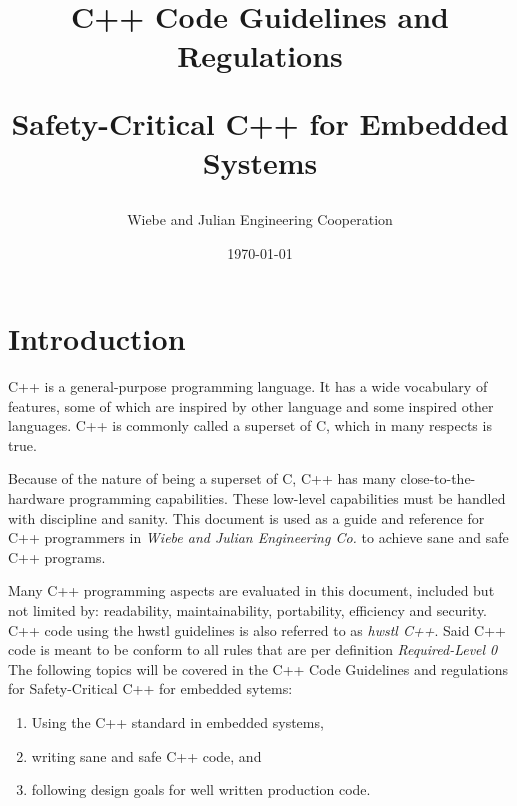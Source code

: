 \documentclass[12pt]{article}
\title{
      C++ Code Guidelines and Regulations \\
      \begin{large}
         Safety-Critical C++ for Embedded Systems
      \end{large}
}
\date{\today}
\author{Wiebe and Julian Engineering Cooperation}
\newcommand{\requirementpriority}[1]{\emph{Required-Level #1}}
\begin{document}
\lstset{language=C++}

\maketitle

\newpage
{} %
\tableofcontents
\newpage
{} %

\newpage
\section{Introduction}
C++ is a general-purpose programming language. It has a wide vocabulary of
features, some of which are inspired by other language and some inspired other
languages. C++ is commonly called a superset of C, which in many respects
is true.

Because of the nature of being a superset of C, C++ has many
close-to-the-hardware programming capabilities. These low-level capabilities
must be handled with discipline and sanity. This document is used as a guide
and reference for C++ programmers in \textit{Wiebe and Julian Engineering Co.}
to achieve sane and safe C++ programs.

Many C++ programming aspects are evaluated in this document, included but not
limited by: readability, maintainability, portability, efficiency and security. \\
C++ code using the hwstl guidelines is also referred to as \textit{hwstl C++}.
Said C++ code is meant to be conform to all rules that are per definition
\requirementpriority{0} \\
The following topics will be covered in the C++ Code Guidelines and regulations
for Safety-Critical C++ for embedded sytems:
\begin{enumerate}
   \item Using the C++ standard in embedded systems,
   \item writing sane and safe C++ code, and
   \item following design goals for well written production code.
\end{enumerate}
\end{document}
